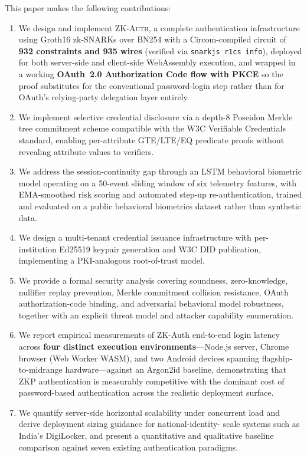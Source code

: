 \documentclass[journal,twoside,10pt]{IEEEtran}
\begin{document}
This paper makes the following contributions:

\begin{enumerate}
  \item We design and implement \textsc{ZK-Auth}, a complete authentication
        infrastructure using Groth16 zk-SNARKs over BN254 with a
        Circom-compiled circuit of \textbf{932 constraints and 935 wires}
        (verified via \texttt{snarkjs r1cs info}), deployed for both
        server-side and client-side WebAssembly execution, and wrapped in
        a working \textbf{OAuth~2.0 Authorization Code flow with PKCE}
        so the proof substitutes for the conventional password-login step
        rather than for OAuth's relying-party delegation layer entirely.

  \item We implement selective credential disclosure via a depth-8 Poseidon
        Merkle tree commitment scheme compatible with the W3C Verifiable
        Credentials standard, enabling per-attribute GTE/LTE/EQ predicate
        proofs without revealing attribute values to verifiers.

  \item We address the session-continuity gap through an LSTM behavioral
        biometric model operating on a 50-event sliding window of six
        telemetry features, with EMA-smoothed risk scoring and automated
        step-up re-authentication, trained and evaluated on a public
        behavioral biometrics dataset rather than synthetic data.

  \item We design a multi-tenant credential issuance infrastructure with
        per-institution Ed25519 keypair generation and W3C DID publication,
        implementing a PKI-analogous root-of-trust model.

  \item We provide a formal security analysis covering soundness,
        zero-knowledge, nullifier replay prevention, Merkle commitment
        collision resistance, OAuth authorization-code binding, and
        adversarial behavioral model robustness, together with an
        explicit threat model and attacker capability enumeration.

  \item We report empirical measurements of ZK-Auth end-to-end login latency
        across \textbf{four distinct execution environments}---Node.js
        server, Chrome browser (Web Worker WASM), and two Android devices
        spanning flagship-to-midrange hardware---against an Argon2id
        baseline, demonstrating that ZKP authentication is measurably
        competitive with the dominant cost of password-based authentication
        across the realistic deployment surface.

  \item We quantify server-side horizontal scalability under concurrent
        load and derive deployment sizing guidance for national-identity-
        scale systems such as India's DigiLocker, and present a
        quantitative and qualitative baseline comparison against seven
        existing authentication paradigms.
\end{enumerate}
\end{document}
